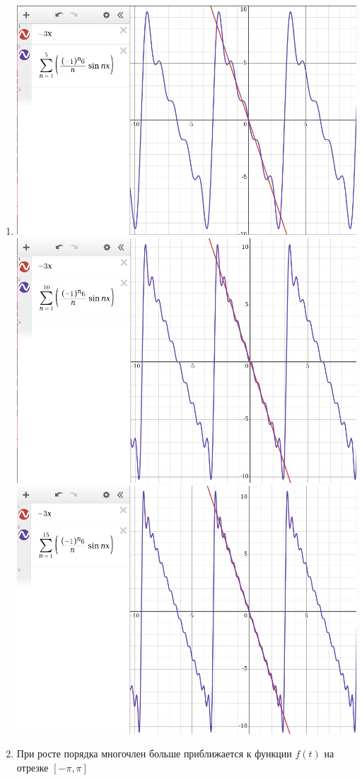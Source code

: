 \begin{enumerate}
    \item \includegraphics{images/1b_a} \\
        \includegraphics{images/1b_b} \\
        \includegraphics{images/1b_c}
    \item При росте порядка многочлен больше приближается к функции $f(t)$ на отрезке $[-\pi, \pi]$
\end{enumerate}
